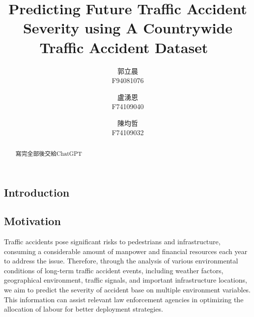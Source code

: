 \documentclass[10pt,twocolumn,letterpaper]{article}
\begin{document}
\begin{CJK}{UTF8}{bsmi}
\title{Predicting Future Traffic Accident Severity using A Countrywide Traffic Accident Dataset~\cite{2019arXiv190605409M}\cite{2019arXiv190909638M}}

\author{
郭立晨 \\
F94081076\\
\and
盧湧恩\\
F74109040\\
\and
陳均哲\\
F74109032\\
}
\maketitle

\begin{abstract}
寫完全部後交給ChatGPT
\end{abstract}

\section{Introduction}
\label{sec:intro}


\subsection{Motivation}

Traffic accidents pose significant risks to pedestrians and infrastructure, consuming a considerable amount of manpower and financial resources each year to address the issue. Therefore, through the analysis of various environmental conditions of long-term traffic accident events, including weather factors, geographical environment, traffic signals, and important infrastructure locations, we aim to predict the severity of accident base on multiple environment variables. This information can assist relevant law enforcement agencies in optimizing the allocation of labour for better deployment strategies.


\end{CJK}
\end{document}
